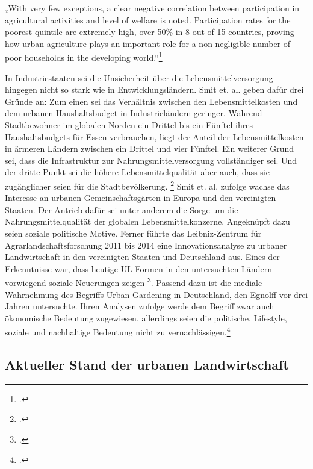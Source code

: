 \documentclass{scrartcl}
\begin{document}
\begin{displayquote}
„With very few exceptions, a clear negative correlation between participation in agricultural activities and level of welfare is noted. Participation rates for the poorest quintile are extremely high, over 50\% in 8 out of 15 countries, proving how urban agriculture plays an important role for a non-negligible number of poor households in the developing world.“\footcite[S.268]{Zezza2010UrbanCountries}
\end{displayquote}
In Industriestaaten sei die Unsicherheit über die Lebensmittelversorgung hingegen nicht so stark wie in Entwicklungsländern. Smit et. al. geben dafür drei Gründe an: Zum einen sei das Verhältnis zwischen den Lebensmittelkosten und dem urbanen Haushaltsbudget in Industrieländern geringer. Während Stadtbewohner im globalen Norden ein Drittel bis ein Fünftel ihres Haushaltsbudgets für Essen verbrauchen, liegt der Anteil der Lebensmittelkosten in ärmeren Ländern zwischen ein Drittel und vier Fünftel. Ein weiterer Grund sei, dass die Infrastruktur zur Nahrungsmittelversorgung vollständiger sei. Und der dritte Punkt sei die höhere Lebensmittelqualität aber auch, dass sie zugänglicher seien für die Stadtbevölkerung. \footcites[Vgl.][S.27]{SmitUrbanToday} Smit et. al. zufolge wachse das Interesse an urbanen Gemeinschaftsgärten in Europa und den vereinigten Staaten. Der Antrieb dafür sei unter anderem die Sorge um die Nahrungsmittelqualität der globalen Lebensmittelkonzerne. Angeknüpft dazu seien soziale politische Motive. Ferner führte das Leibniz-Zentrum für Agrarlandschaftsforschung 2011 bis 2014 eine Innovationsanalyse zu urbaner Landwirtschaft in den vereinigten Staaten und Deutschland aus. Eines der Erkenntnisse war, dass heutige UL-Formen in den untersuchten Ländern vorwiegend soziale Neuerungen zeigen \footcite{Berges2004UrbaneStadt}. Passend dazu ist die mediale Wahrnehmung des Begriffs Urban Gardening in Deutschland, den Egnolff vor drei Jahren untersuchte. Ihren Analysen zufolge werde dem Begriff zwar auch ökonomische Bedeutung zugewiesen, allerdings seien die politische, Lifestyle, soziale und nachhaltige Bedeutung nicht zu vernachlässigen.\footcite[Vgl.][S.119ff]{Egnolff2015DieIdeal}



\subsection{Aktueller Stand der urbanen Landwirtschaft}
\end{document}
